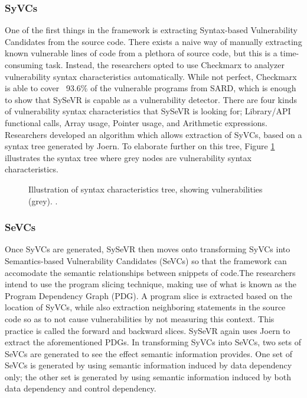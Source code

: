 \documentclass[12pt,twocolumn,letterpaper]{article}
\begin{document}
\subsubsection{SyVCs}
One of the first things in the framework is extracting Syntax-based Vulnerability Candidates from the source code.
There exists a naive way of manually extracting known vulnerable lines of code from a plethora of source code, but this is a time-consuming task.
Instead, the researchers opted to use Checkmarx to analyzer vulnerability syntax characteristics automatically. While not perfect, Checkmarx is able to cover
~93.6\% of the vulnerable programs from SARD, which is enough to show that SySeVR is capable as a vulnerability detector.
There are four kinds of vulnerability syntax characteristics that SySeVR is looking for; Library/API functional calls, Array usage, Pointer usage, and Arithmetic expressions.
Researchers developed an algorithm which allows extraction of SyVCs, based on a syntax tree generated by Joern. To elaborate further on this tree,
Figure \ref{fig:sys-2} illustrates the syntax tree where grey nodes are vulnerability syntax characteristics.

\begin{figure}[h]
    \centering
    \caption{Illustration of syntax characteristics tree, showing vulnerabilities (grey). \cite{Li22}.}
    \label{fig:sys-2}
\end{figure}

\subsubsection{SeVCs}
Once SyVCs are generated, SySeVR then moves onto transforming SyVCs into Semantics-based Vulnerability Candidates (SeVCs) so that the framework can accomodate the
semantic relationships between snippets of code.The researchers intend to use the program slicing technique, making use of what is known as the
Program Dependency Graph (PDG). A program slice is extracted based on the location of SyVCs, while also extraction neighboring statements in the source code so as to not cause
vulnerabilities by not measuring this context. This practice is called the forward and backward slices. SySeVR again uses Joern to extract the aforementioned PDGs.
In transforming SyVCs into SeVCs, two sets of SeVCs are generated to see the effect semantic information provides. One set of SeVCs is generated
by using semantic information induced by data dependency only; the other set is generated by using semantic information induced by both
data dependency and control dependency.
\end{document}
